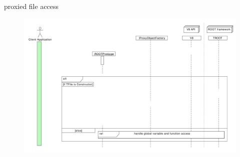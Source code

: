 \begin{frame}{proxied file access}
  \begin{figure}[htb]
    \centering
    \includegraphics[width=\textwidth, height=.85\textheight, keepaspectratio]{./resources/proxycall/fileOpen_h1.pdf}
  \end{figure}
\end{frame}

